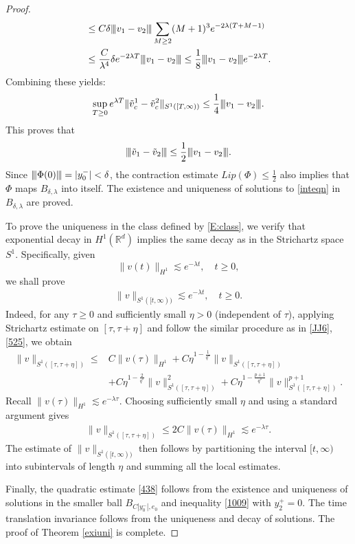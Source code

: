 \documentclass[10pt,a4paper]{amsart}
\newcommand{\R}{\mathbb R}
\newcommand{\lsm}{\lesssim}
\newcommand{\vertiii}[1]{{\left\vert\kern-0.25ex\left\vert\kern-0.25ex\left\vert #1 
    \right\vert\kern-0.25ex\right\vert\kern-0.25ex\right\vert}}
\begin{document}
\begin{proof}
\begin{align*}
	   &\le C\delta \vertiii{v_1-v_2} \sum_{
			   M\ge 2
                   	      }(M+1)^3  e^{-2\lambda (T+M-1)} \\
	  & \le \frac C{\lambda^4} \delta e^{-2\lambda T}\vertiii{v_1-v_2}\le \frac 18\vertiii{v_1-v_2} e^{-2\lambda T}. 
	   \end{align*}
Combining these yields:
\begin{align}\label{1016}
\sup_{T\ge 0}e^{\lambda T}\|\tilde v^1_c-\tilde v^2_c\|_{ S^1([T,\infty))}\le\frac 14 \vertiii{v_1-v_2}.
\end{align}
This proves that 
\begin{align*}
\vertiii{\tilde v_1-\tilde v_2}\le \frac 12\vertiii{v_1-v_2}.
\end{align*}
Since $\vertiii {\Phi(0)} = |y_0^-| < \delta$,  the contraction estimate $Lip( \Phi) \le \frac 12$ also implies that  
$\Phi$ maps $B_{\delta,\lambda}$ into itself. The existence and uniqueness of solutions to \eqref{inteqn} in $B_{\delta,\lambda}$ are proved. 


  



To prove the uniqueness in the class defined by \eqref{E:class}, we verify that 
exponential decay in $H^1(\R^d)$ implies the same decay as in the Strichartz space $S^1$. Specifically, given 
\[
\|v(t) \|_{H^1} \lsm e^{-\lambda t}, \quad t\ge 0,
\]
we shall prove
\begin{align}\label{a101}
\| v\|_{S^1 ([t, \infty))} \lsm e^{-\lambda t}, \quad t\ge 0.
\end{align}
Indeed, for any $\tau\ge 0$ and sufficiently small $\eta>0$ (independent of $\tau$), applying Strichartz estimate on $[\tau, \tau+\eta]$ and follow the similar procedure as in \eqref{JJ6}, \eqref{525}, we obtain
\begin{align*}
\|v\|_{ S^1{([\tau,\tau+\eta])}}\le &C\|v(\tau)\|_{H^1}+C\eta^{1-\frac 1{q^*}}\|v\|_{ S^1{([\tau,\tau+\eta])}}\\
&+C\eta^{1-\frac 2{q^*}}\|v\|_{ S^1{([\tau,\tau+\eta])}}^2+C\eta^{1-\frac{p+1}{q^*}}\|v\|_{ S^1{([\tau,\tau+\eta])}}^{p+1}.
\end{align*}
 Recall $\|v(\tau)\|_{H^1}\lsm e^{-\lambda \tau}$. Choosing sufficiently small $\eta$ and using a standard argument gives 
\begin{align*}
\|v\|_{S^1([\tau,\tau+\eta])}\le 2C\|v(\tau)\|_{H^1}\lsm e^{-\lambda \tau}. 
\end{align*}
The estimate of $\|v\|_{ S^1([t,\infty))}$ then follows by partitioning the interval $[t,\infty)$ into subintervals of length $\eta$ and summing all the local estimates.

Finally, the quadratic estimate \eqref{438} follows from the existence and uniqueness of solutions in the smaller ball $B_{C |y_0^-|, e_0}$ and inequality \eqref{1009} with $y_2^+ =0$. The time translation invariance follows from the uniqueness and decay of solutions. The proof of Theorem \ref{exiuni} is complete. 
\end{proof}
\end{document}
